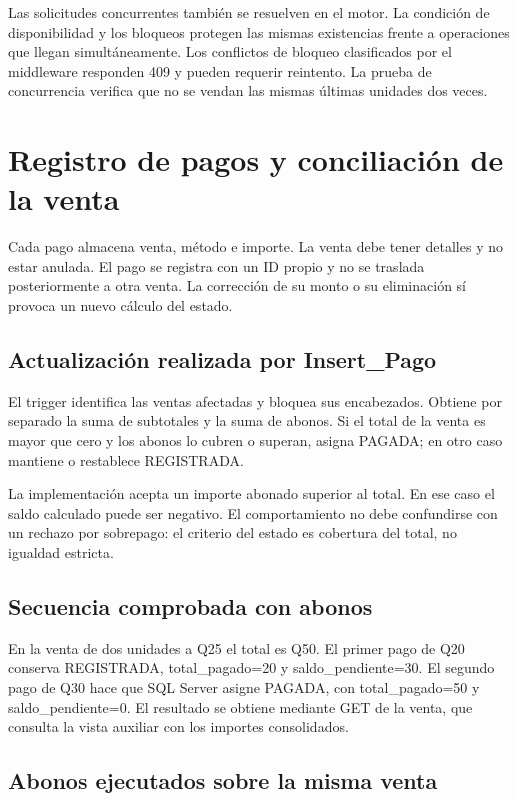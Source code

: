 \documentclass[10pt,letterpaper]{article}
\begin{document}
Las solicitudes concurrentes también se resuelven en el motor. La condición de disponibilidad y los bloqueos protegen las mismas existencias frente a operaciones que llegan simultáneamente. Los conflictos de bloqueo clasificados por el middleware responden 409 y pueden requerir reintento. La prueba de concurrencia verifica que no se vendan las mismas últimas unidades dos veces.

\section{Registro de pagos y conciliación de la venta}
Cada pago almacena venta, método e importe. La venta debe tener detalles y no estar anulada. El pago se registra con un ID propio y no se traslada posteriormente a otra venta. La corrección de su monto o su eliminación sí provoca un nuevo cálculo del estado.

\subsection{Actualización realizada por Insert\_Pago}
El trigger identifica las ventas afectadas y bloquea sus encabezados. Obtiene por separado la suma de subtotales y la suma de abonos. Si el total de la venta es mayor que cero y los abonos lo cubren o superan, asigna PAGADA; en otro caso mantiene o restablece REGISTRADA.

La implementación acepta un importe abonado superior al total. En ese caso el saldo calculado puede ser negativo. El comportamiento no debe confundirse con un rechazo por sobrepago: el criterio del estado es cobertura del total, no igualdad estricta.

\subsection{Secuencia comprobada con abonos}
En la venta de dos unidades a Q25 el total es Q50. El primer pago de Q20 conserva REGISTRADA, total\_pagado=20 y saldo\_pendiente=30. El segundo pago de Q30 hace que SQL Server asigne PAGADA, con total\_pagado=50 y saldo\_pendiente=0. El resultado se obtiene mediante GET de la venta, que consulta la vista auxiliar con los importes consolidados.



\subsection{Abonos ejecutados sobre la misma venta}
\end{document}
